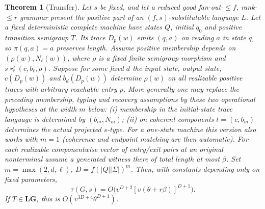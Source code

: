 \documentclass[11pt]{article}
\newtheorem{rdtheorem}{Theorem}
\newcommand{\rdLG}{\mathbf{LG}}
\begin{document}
\begin{rdtheorem}[Transfer]
Let $s$ be fixed, and let a reduced good fan-out-$\le f$, rank-$\le r$
grammar present the positive part of an $(f,s)$-substitutable language $L$.
Let a fixed deterministic complete machine have states $Q$, initial $q_0$
and positive transition semigroup $T$. Its trace $D_p(w)$ emits $(q,a)$
on reading $a$ in state $q$, so $\pi(q,a)=a$ preserves length.
Assume positive membership depends on $(\rho(w),N_\ell(w))$, where
$\rho$ is a fixed finite semigroup morphism and
$s\preceq(c,b_\ell,\rho)$. Suppose for some fixed $d$ the input state,
output state, $c(D_p(w))$ and $b_d(D_p(w))$ determine $\rho(w)$ on
all realizable positive traces with arbitrary reachable entry $p$.
More generally one may replace the preceding membership, typing and recovery
assumptions by these two operational hypotheses at the width $m$ below:
(i) membership in the initial-state trace language is determined by
$(b_m,N_m)$; (ii) on coherent components $t=(c,b_m)$ determines the
actual projected $s$-type. For a one-state machine this version also works
with $m=1$ (coherence and endpoint matching are then automatic).
For each realizable componentwise vector of entry/exit pairs at an original
nonterminal assume a generated witness there of total length at most $\beta$.
Set $m=\max(2,d,\ell)$, $D=f(|Q||\Sigma|)^m$.
Then, with constants depending only on fixed parameters,
\[
 \tau(G,s)=O\big(v^{D+2}[v(\theta+r\beta)]^{D+1}\big).
\]
If $T\in\rdLG$, this is $O(v^{3D+4}\theta^{D+1})$.
\end{rdtheorem}
\end{document}
